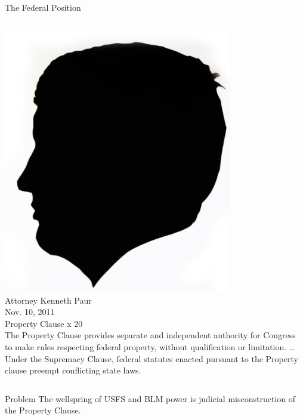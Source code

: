\begin{frame}{The Federal Position}
    \begin{columns}[c]
            \centering
            \includegraphics[width=0.75\textwidth]{img/elmer-dickens.png} \\
            Attorney Kenneth Paur \\
            Nov. 10, 2011 \\
            Property Clause x 20 \\
            The Property Clause provides separate and independent authority for
            Congress to make rules respecting federal property, without
            qualification or limitation. \ldots  Under the Supremacy Clause,
            federal statutes enacted pursuant to the Property clause preempt
            conflicting state laws.
    \end{columns}
\end{frame}

\begin{frame}
    \begin{varblock}[.8\textwidth]{Problem}
        The wellspring of USFS and BLM power is judicial misconstruction of the Property Clause.
    \end{varblock}
\end{frame}

